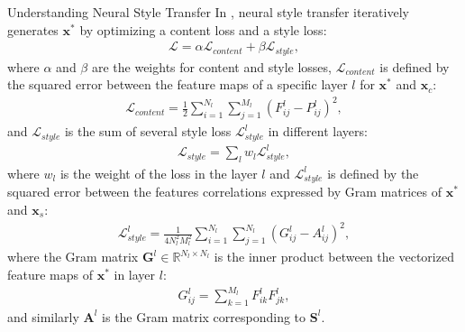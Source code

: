 \documentclass{article}
\begin{document}
\begin{section}{Understanding Neural Style Transfer}
In \cite{neuralart}, neural style transfer iteratively generates $\mathbf{x}^*$ by optimizing a content loss and a style loss:
\begin{equation}\label{eq:total_loss}
\begin{aligned}
\mathcal{L} = \alpha\mathcal{L}_{content} + \beta\mathcal{L}_{style},
\end{aligned}
\end{equation}
where $\alpha$ and $\beta$ are the weights for content and style losses, $\mathcal{L}_{content}$ is defined by the squared error between the feature maps of a specific layer $l$ for $\mathbf{x}^*$ and $\mathbf{x}_c$:
\begin{equation}
\begin{aligned}
\mathcal{L}_{content} = \frac{1}{2}\sum_{i=1}^{N_l}\sum_{j=1}^{M_l}(F_{ij}^l - P_{ij}^l)^2,
\end{aligned}
\end{equation}
and $\mathcal{L}_{style}$ is the sum of several style loss $\mathcal{L}_{style}^{l}$ in different layers:
\begin{equation}
\begin{aligned}
\mathcal{L}_{style} = \sum_{l} w_l\mathcal{L}_{style}^{l},
\end{aligned}
\end{equation}
where $w_l$ is the weight of the loss in the layer $l$ and  $\mathcal{L}_{style}^{l}$ is defined by the squared error between the features correlations expressed by Gram matrices of $\mathbf{x}^*$ and $\mathbf{x}_s$:
\begin{equation}\label{eq_style}
\begin{aligned}
\mathcal{L}_{style}^l = \frac{1}{4N_l^2M_l^2}\sum_{i=1}^{N_l}\sum_{j=1}^{N_l}(G_{ij}^l - A_{ij}^l)^2,
\end{aligned}
\end{equation}
where the Gram matrix $\mathbf{G}^l \in \mathbb{R}^{N_l \times N_l}$ is the inner product between the vectorized feature maps of $\mathbf{x}^*$ in layer $l$:
\begin{equation}
\begin{aligned}
G_{ij}^l = \sum_{k=1}^{M_l}F_{ik}^lF_{jk}^l,
\end{aligned}
\end{equation}
and similarly $\mathbf{A}^l$ is the Gram matrix corresponding to $\mathbf{S}^l$.


\end{section}
\end{document}
